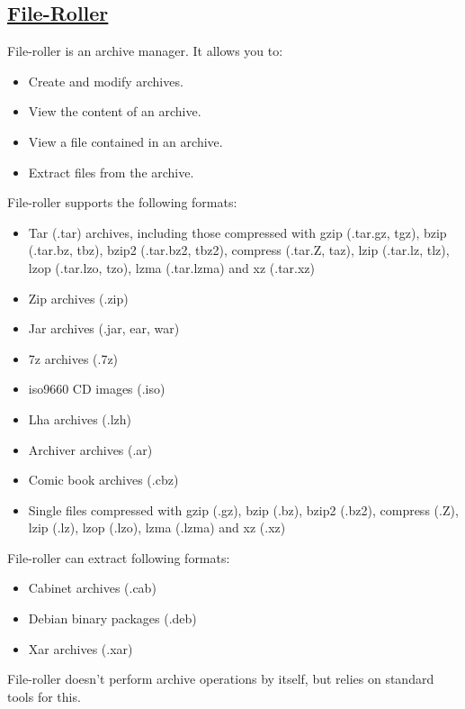 \subsection{\href{http://fileroller.sourceforge.net/}{File-Roller}}

 File-roller is an archive manager. It allows you to:

\begin{itemize}
 \item Create and modify archives.
 \item View the content of an archive.
 \item View a file contained in an archive.
 \item Extract files from the archive.
\end{itemize}
 
 File-roller supports the following formats:

\begin{itemize}
 \item Tar (.tar) archives, including those compressed with
    gzip (.tar.gz, tgz), bzip (.tar.bz, tbz), bzip2 (.tar.bz2, tbz2),
    compress (.tar.Z, taz), lzip (.tar.lz, tlz), lzop (.tar.lzo, tzo),
    lzma (.tar.lzma) and xz (.tar.xz)
 \item Zip archives (.zip)
 \item Jar archives (.jar, ear, war)
 \item 7z archives (.7z)
 \item iso9660 CD images (.iso)
 \item Lha archives (.lzh)
 \item Archiver archives (.ar)
 \item Comic book archives (.cbz)
 \item Single files compressed with gzip (.gz), bzip (.bz), bzip2 (.bz2),
    compress (.Z), lzip (.lz), lzop (.lzo), lzma (.lzma) and xz (.xz)
\end{itemize}
 
 File-roller can extract following formats:

\begin{itemize}
 \item Cabinet archives (.cab)
 \item Debian binary packages (.deb)
 \item Xar archives (.xar)
\end{itemize}
 
 File-roller doesn't perform archive operations by itself, but relies on
 standard tools for this.

